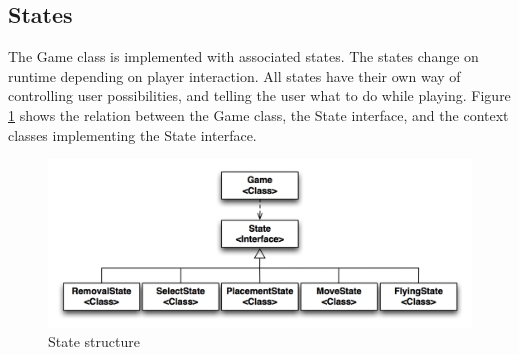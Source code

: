 \pagebreak
\subsection{States}

The Game class is implemented with associated states. The states change on runtime depending on player interaction. All states have their own way of controlling user possibilities, and telling the user what to do while playing. Figure \ref{fig:states} shows the relation between the Game class, the State interface, and the context classes implementing the State interface.

\begin{figure}[H]
\begin{center}
\includegraphics[width=\textwidth]{Images/states}
\caption{State structure}
\label{fig:states}
\end{center}
\end{figure}

